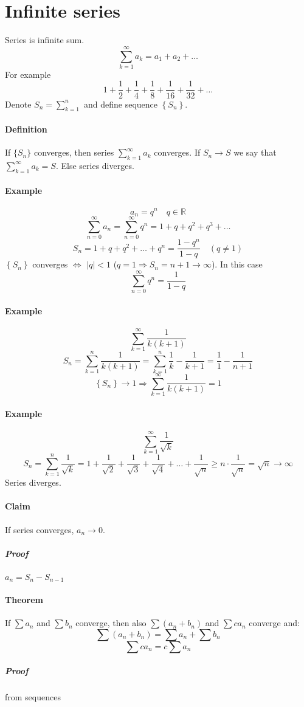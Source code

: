 \section{Infinite series}
Series is infinite sum.
$$\sum_{k=1}^\infty a_k = a_1+a_2+\dots$$
For example
$$1+\frac{1}{2}+\frac{1}{4}+\frac{1}{8}+\frac{1}{16}+\frac{1}{32}+\dots$$
Denote $S_n = \sum_{k=1}^{n}$ and define sequence $\left\{ S_n \right\}$.
\paragraph{Definition} If $\{ S_n \}$ converges, then series $\sum_{k=1}^\infty a_k $ converges. If $S_n \longrightarrow S$ we say that $\sum_{k=1}^\infty a_k = S$. Else series diverges.
\paragraph{Example} $$a_n = q^n \quad q\in\mathbb{R}$$
$$\sum_{n=0}^\infty a_n = \sum_{n=0}^\infty q^n = 1+q+q^2+q^3+\dots$$
$$S_n = 1+q+q^2+\dots + q^n = \frac{1-q^n}{1-q} \quad (q\neq1)$$
$\left\{ S_n \right\}$ converges $\iff$ $\left|q\right|<1$ ($q=1 \Rightarrow S_n = n+1 \to \infty$). In this case $$\sum_{n=0}^\infty q^n= \frac{1}{1-q}$$
\paragraph{Example} $$\sum_{k=1}^{\infty} \frac{1}{k(k+1)}$$
$$S_n = \sum_{k=1}^{n} \frac{1}{k(k+1)} = \sum_{k=1}^{n} \frac{1}{k} -  \frac{1}{k+1} = \frac{1}{1} - \frac{1}{n+1}$$
$$\left\{S_n\right\} \to 1 \Rightarrow \sum_{k=1}^{\infty} \frac{1}{k(k+1)} = 1$$
\paragraph{Example} $$\sum_{k=1}^{\infty} \frac{1}{\sqrt{k}}$$
$$S_n = \sum_{k=1}^{n} \frac{1}{\sqrt{k}} = 1+\frac{1}{\sqrt{2}}+\frac{1}{\sqrt{3}}+\frac{1}{\sqrt{4}}+\dots+\frac{1}{\sqrt{n}} \geq n \cdot \frac{1}{\sqrt{n}} =\sqrt{n} \to \infty$$
Series diverges.
\paragraph{Claim} If series converges, $a_n \to 0$.
\subparagraph{Proof} $a_n = S_n - S_{n-1}$
\paragraph{Theorem} If $\sum a_n$ and $\sum b_n$ converge, then also $\sum (a_n+b_n)$ and $\sum c a_n$ converge and:
$$\sum (a_n+b_n) = \sum a_n + \sum b_n$$
$$\sum ca_n = c\sum a_n$$
\subparagraph{Proof} from sequences

